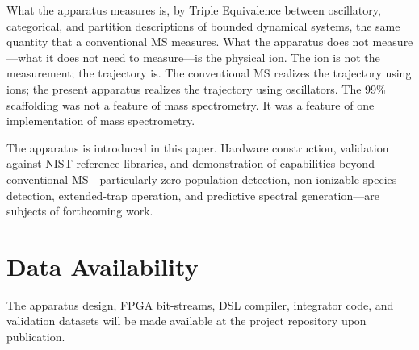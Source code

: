 \documentclass[twocolumn,11pt,a4paper]{article}
\theoremstyle{definition}
\theoremstyle{remark}
\begin{document}
What the apparatus measures is, by Triple Equivalence between oscillatory, categorical, and partition descriptions of bounded dynamical systems, the same quantity that a conventional MS measures. What the apparatus does not measure---what it does not need to measure---is the physical ion. The ion is not the measurement; the trajectory is. The conventional MS realizes the trajectory using ions; the present apparatus realizes the trajectory using oscillators. The 99\% scaffolding was not a feature of mass spectrometry. It was a feature of one implementation of mass spectrometry.

The apparatus is introduced in this paper. Hardware construction, validation against NIST reference libraries, and demonstration of capabilities beyond conventional MS---particularly zero-population detection, non-ionizable species detection, extended-trap operation, and predictive spectral generation---are subjects of forthcoming work.

\section*{Data Availability}

The apparatus design, FPGA bit-streams, DSL compiler, integrator code, and validation datasets will be made available at the project repository upon publication.



\end{document}
